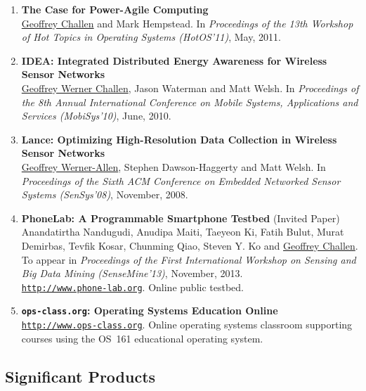 \begin{enumerate}

\item \textbf{The Case for Power-Agile Computing}\\\uline{Geoffrey Challen}
and Mark Hempstead. In \emph{Proceedings of the 13th Workshop of Hot Topics
in Operating Systems (HotOS'11)}, May, 2011.
\nocite{poweragile-hotos11}

\item \textbf{IDEA: Integrated Distributed Energy Awareness for Wireless Sensor
Networks}\\ \uline{Geoffrey Werner Challen}, Jason Waterman and Matt Welsh. In
\emph{Proceedings of the 8th Annual International Conference on Mobile Systems,
Applications and Services (MobiSys'10)}, June, 2010.
\nocite{idea-mobisys10}

\item \textbf{Lance: Optimizing High-Resolution Data Collection in Wireless
Sensor Networks}\\ \uline{Geoffrey Werner-Allen}, Stephen Dawson-Haggerty and
Matt Welsh. In \emph{Proceedings of the Sixth ACM Conference on Embedded
Networked Sensor Systems (SenSys'08)}, November, 2008.
\nocite{lance-sensys08}

\item \textbf{PhoneLab: A Programmable Smartphone Testbed} (Invited Paper)\\
Anandatirtha Nandugudi, Anudipa Maiti, Taeyeon Ki, Fatih Bulut, Murat
Demirbas, Tevfik Kosar, Chunming Qiao, Steven Y. Ko and \uline{Geoffrey
Challen}. To appear in \emph{Proceedings of the First International Workshop
on Sensing and Big Data Mining (SenseMine'13)}, November, 2013.\\
\href{http://www.phone-lab.org}{\texttt{http://www.phone-lab.org}}. Online
public testbed. \nocite{phonelab-url,phonelab-sensemine13}

\item \textbf{\texttt{ops-class.org}: Operating Systems Education Online}\\
\href{http://www.ops-class.org}{\texttt{http://www.ops-class.org}}. Online
operating systems classroom supporting courses using the OS~161 educational
operating system.
\nocite{opsclass-url}

\end{enumerate}

\subsection{Significant Products}

